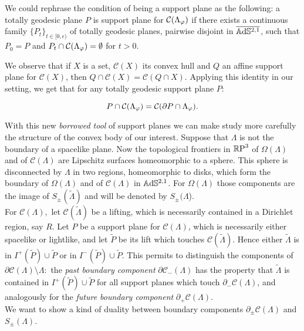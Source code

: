  \begin{observation}\label{diffsupp}
     We could rephrase the condition of being a support plane as the following: a totally geodesic plane $P$ is support plane for $\mathcal{C}(\Lambda_\varphi)$ if there exists a continuous family $\{P_t\}_{t\in[0,\epsilon)}$ of totally geodesic planes, pairwise disjoint in $\overline{\mathbb{A}\mathrm{d}\mathbb{S}^{2,1}}$, such that $P_0=P$ and $P_t\cap\mathcal{C}(\Lambda_\varphi)=\emptyset$ for $t>0$. 
 \end{observation}
We observe that if $X$ is a set, $\mathcal{C}(X)$ its convex hull and $Q$ an affine support plane for $\mathcal{C}(X)$, then $Q\cap\mathcal{C}(X)=\mathcal{C}(Q\cap X).$ Applying this identity in our setting, we get that for any totally geodesic support plane $P$: 

\begin{equation}\label{suplane}
    P\cap\mathcal{C}(\Lambda_\varphi)=\mathcal{C}(\partial P\cap\Lambda_\varphi).
\end{equation}

With this new \textit{borrowed tool} of support planes we can make study more carefully the structure of the convex body of our interest. Suppose that $\Lambda$ is not the boundary of a spacelike plane. Now the topological frontiers in $\mathbb{R}\text{P}^3$ of $\Omega(\Lambda)$ and of $\mathcal{C}(\Lambda)$ are Lipschitz surfaces homeomorphic to a sphere. This sphere is disconnected by $\Lambda$ in two regions, homeomorphic to disks, which form the boundary of $\Omega(\Lambda)$ and of $\mathcal{C}(\Lambda)$ in $\mathbb{A}\mathrm{d}\mathbb{S}^{2,1}$. For $\Omega(\Lambda)$ those components are the image of $S_\pm(\widetilde{\Lambda})$ and will be denoted by $S_\pm(\Lambda$). \\
For $\mathcal{C}(\Lambda),$ let $\mathcal{C}(\widetilde{\Lambda})$ be a lifting, which is necessarily contained in a Dirichlet region, say $R$. Let $P$ be a support plane for $\mathcal{C}(\Lambda)$, which is necessarily either spacelike or lightlike, and let $\widetilde{P}$ be its lift which touches $\mathcal{C}(\widetilde{\Lambda}).$ Hence either $\widetilde{\Lambda}$ is in $I^+(\widetilde{P})\cup\widetilde{P}$ or in $I^-(\widetilde{P})\cup\widetilde{P}$. This permits to distinguish the components of $\partial\mathcal{C}(\Lambda)\setminus\Lambda:$ the \textit{past boundary component} $\partial\mathcal{C}_-(\Lambda)$ has the property that $\widetilde{\Lambda}$ is contained in $I^+(\widetilde{P})\cup \widetilde{P}$ for all support planes which touch $\partial_-\mathcal{C}(\Lambda)$, and analogously for the \textit{future boundary component} $\partial_+\mathcal{C}(\Lambda)$.\\
We want to show a kind of duality between boundary components $\partial_\pm\mathcal{C}(\Lambda)$ and $S_\pm(\Lambda)$. 

